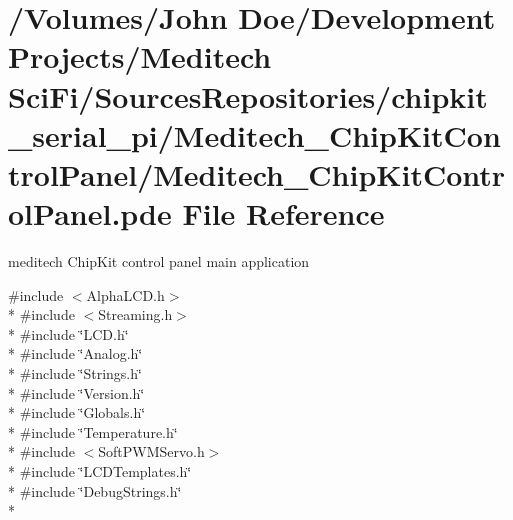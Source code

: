 \hypertarget{_meditech___chip_kit_control_panel_8pde}{\section{/\-Volumes/\-John Doe/\-Development Projects/\-Meditech Sci\-Fi/\-Sources\-Repositories/chipkit\-\_\-serial\-\_\-pi/\-Meditech\-\_\-\-Chip\-Kit\-Control\-Panel/\-Meditech\-\_\-\-Chip\-Kit\-Control\-Panel.pde File Reference}
\label{_meditech___chip_kit_control_panel_8pde}
}


meditech Chip\-Kit control panel main application  


{\ttfamily \#include $<$Alpha\-L\-C\-D.\-h$>$}\\*
{\ttfamily \#include $<$Streaming.\-h$>$}\\*
{\ttfamily \#include \char`\"{}L\-C\-D.\-h\char`\"{}}\\*
{\ttfamily \#include \char`\"{}Analog.\-h\char`\"{}}\\*
{\ttfamily \#include \char`\"{}Strings.\-h\char`\"{}}\\*
{\ttfamily \#include \char`\"{}Version.\-h\char`\"{}}\\*
{\ttfamily \#include \char`\"{}Globals.\-h\char`\"{}}\\*
{\ttfamily \#include \char`\"{}Temperature.\-h\char`\"{}}\\*
{\ttfamily \#include $<$Soft\-P\-W\-M\-Servo.\-h$>$}\\*
{\ttfamily \#include \char`\"{}L\-C\-D\-Templates.\-h\char`\"{}}\\*
{\ttfamily \#include \char`\"{}Debug\-Strings.\-h\char`\"{}}\\*
